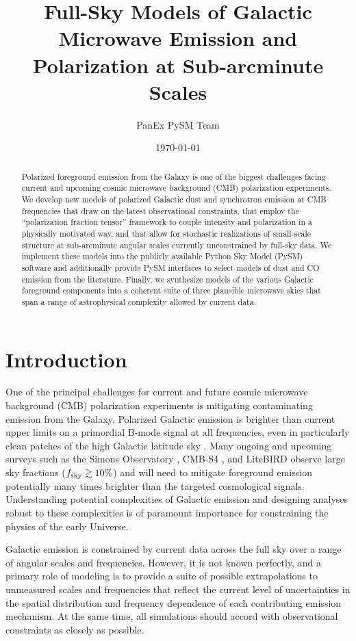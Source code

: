 \documentclass[twocolumn]{aastex631}
\begin{document}
\title{Full-Sky Models of Galactic Microwave Emission and Polarization at Sub-arcminute Scales}
\author{PanEx PySM Team}
\date{\today}

\begin{abstract}
Polarized foreground emission from the Galaxy is one of the biggest challenges facing current and upcoming cosmic microwave background (CMB) polarization experiments. We develop new models of polarized Galactic dust and synchrotron emission at CMB frequencies that draw on the latest observational constraints, that employ the ``polarization fraction tensor'' framework to couple intensity and polarization in a physically motivated way, and that allow for stochastic realizations of small-scale structure at sub-arcminute angular scales currently unconstrained by full-sky data. We implement these models into the publicly available Python Sky Model (PySM) software and additionally provide PySM interfaces to select models of dust and CO emission from the literature. Finally, we synthesize models of the various Galactic foreground components into a coherent suite of three plausible microwave skies that span a range of astrophysical complexity allowed by current data.
\end{abstract}

\section{Introduction}
One of the principal challenges for current and future cosmic microwave background (CMB) polarization experiments is mitigating contaminating emission from the Galaxy. Polarized Galactic emission is brighter than current upper limits on a primordial B-mode signal at all frequencies, even in particularly clean patches of the high Galactic latitude sky \citep{planck2016-l11A}. Many ongoing and upcoming surveys such as the Simons Observatory \citep{Ade:2019}, CMB-S4 \citep{Abazajian:2022}, and LiteBIRD \citep{LiteBIRDCollaboration:2023} observe large sky fractions ($f_{\rm sky} \gtrsim 10\%$) and will need to mitigate foreground emission potentially many times brighter than the targeted cosmological signals. Understanding potential complexities of Galactic emission and designing analyses robust to these complexities is of paramount importance for constraining the physics of the early Universe.

Galactic emission is constrained by current data across the full sky over a range of angular scales and frequencies. However, it is not known perfectly, and a primary role of modeling is to provide a suite of possible extrapolations to unmeasured scales and frequencies that reflect the current level of uncertainties in the spatial distribution and frequency dependence of each contributing emission mechanism. At the same time, all simulations should accord with observational constraints as closely as possible.
\end{document}
